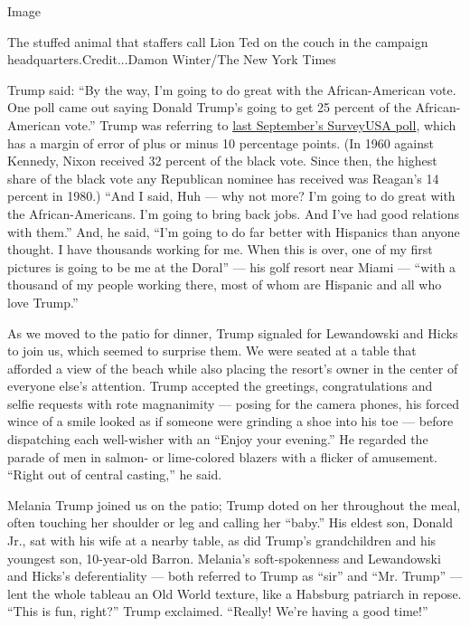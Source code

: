 Image

The stuffed animal that staffers call Lion Ted on the couch in the
campaign headquarters.Credit...Damon Winter/The New York Times

Trump said: ``By the way, I'm going to do great with the
African-American vote. One poll came out saying Donald Trump's going to
get 25 percent of the African-American vote.'' Trump was referring to
\href{http://www.surveyusa.com/client/PollReport.aspx?g=d950cadf-05ce-4148-a125-35c0cdab26c6}{last
September's SurveyUSA poll}, which has a margin of error of plus or
minus 10 percentage points. (In 1960 against Kennedy, Nixon received 32
percent of the black vote. Since then, the highest share of the black
vote any Republican nominee has received was Reagan's 14 percent in
1980.) ``And I said, Huh --- why not more? I'm going to do great with
the African-Americans. I'm going to bring back jobs. And I've had good
relations with them.'' And, he said, ``I'm going to do far better with
Hispanics than anyone thought. I have thousands working for me. When
this is over, one of my first pictures is going to be me at the Doral''
--- his golf resort near Miami --- ``with a thousand of my people
working there, most of whom are Hispanic and all who love Trump.''

As we moved to the patio for dinner, Trump signaled for Lewandowski and
Hicks to join us, which seemed to surprise them. We were seated at a
table that afforded a view of the beach while also placing the resort's
owner in the center of everyone else's attention. Trump accepted the
greetings, congratulations and selfie requests with rote magnanimity ---
posing for the camera phones, his forced wince of a smile looked as if
someone were grinding a shoe into his toe --- before dispatching each
well-wisher with an ``Enjoy your evening.'' He regarded the parade of
men in salmon- or lime-colored blazers with a flicker of amusement.
``Right out of central casting,'' he said.

Melania Trump joined us on the patio; Trump doted on her throughout the
meal, often touching her shoulder or leg and calling her ``baby.'' His
eldest son, Donald Jr., sat with his wife at a nearby table, as did
Trump's grandchildren and his youngest son, 10-year-old Barron.
Melania's soft-spokenness and Lewandowski and Hicks's deferentiality ---
both referred to Trump as ``sir'' and ``Mr. Trump'' --- lent the whole
tableau an Old World texture, like a Habsburg patriarch in repose.
``This is fun, right?'' Trump exclaimed. ``Really! We're having a good
time!''

